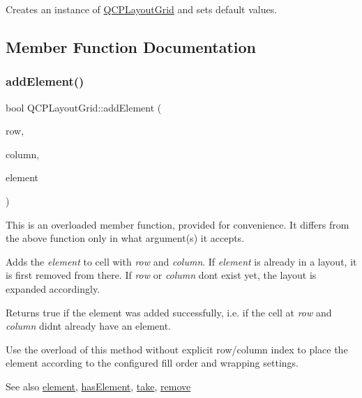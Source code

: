 Creates an instance of \hyperlink{classQCPLayoutGrid}{Q\+C\+P\+Layout\+Grid} and sets default values. 

\subsection{Member Function Documentation}
\mbox{\label{classQCPLayoutGrid_adff1a2ca691ed83d2d24a4cd1fe17012}} 
\subsubsection{\texorpdfstring{add\+Element()}{addElement()}\hspace{0.1cm}{\footnotesize\ttfamily [1/2]}}
{\footnotesize\ttfamily bool Q\+C\+P\+Layout\+Grid\+::add\+Element (\begin{DoxyParamCaption}\item[{int}]{row,  }\item[{int}]{column,  }\item[{\hyperlink{classQCPLayoutElement}{Q\+C\+P\+Layout\+Element} $\ast$}]{element }\end{DoxyParamCaption})}

This is an overloaded member function, provided for convenience. It differs from the above function only in what argument(s) it accepts.

Adds the {\itshape element} to cell with {\itshape row} and {\itshape column}. If {\itshape element} is already in a layout, it is first removed from there. If {\itshape row} or {\itshape column} don\textquotesingle{}t exist yet, the layout is expanded accordingly.

Returns true if the element was added successfully, i.\+e. if the cell at {\itshape row} and {\itshape column} didn\textquotesingle{}t already have an element.

Use the overload of this method without explicit row/column index to place the element according to the configured fill order and wrapping settings.

\begin{DoxySeeAlso}{See also}
\hyperlink{classQCPLayoutGrid_a602b426609b4411cf6a93c3ddf3a381a}{element}, \hyperlink{classQCPLayoutGrid_ab0cf4f7edc9414a3bfaddac0f46dc0a0}{has\+Element}, \hyperlink{classQCPLayoutGrid_aee961c2eb6cf8a85dcbc5a7d7b6c1a00}{take}, \hyperlink{classQCPLayout_a6c58f537d8086f352576ab7c5b15d0bc}{remove} 
\end{DoxySeeAlso}
\mbox{\label{classQCPLayoutGrid_a4c44025dd25acd27e053cadfd448ad7b}} 
